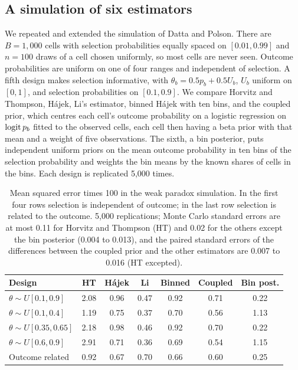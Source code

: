 \subsection{A simulation of six estimators}

We repeated and extended the simulation of Datta and Polson. There are $B = 1{,}000$ cells with selection probabilities equally spaced on $[0.01, 0.99]$ and $n = 100$ draws of a cell chosen uniformly, so most cells are never seen. Outcome probabilities are uniform on one of four ranges and independent of selection. A fifth design makes selection informative, with $\theta_b = 0.5p_b + 0.5U_b$, $U_b$ uniform on $[0,1]$, and selection probabilities on $[0.1, 0.9]$. We compare Horvitz and Thompson, H\'ajek, Li's estimator, binned H\'ajek with ten bins, and the coupled prior, which centres each cell's outcome probability on a logistic regression on $\operatorname{logit} p_b$ fitted to the observed cells, each cell then having a beta prior with that mean and a weight of five observations. The sixth, a bin posterior, puts independent uniform priors on the mean outcome probability in ten bins of the selection probability and weights the bin means by the known shares of cells in the bins. Each design is replicated 5,000 times.

\begin{table}[ht]
\centering
\caption{Mean squared error times 100 in the weak paradox simulation. In the first four rows selection is independent of outcome; in the last row selection is related to the outcome. 5,000 replications; Monte Carlo standard errors are at most 0.11 for Horvitz and Thompson (HT) and 0.02 for the others except the bin posterior (0.004 to 0.013), and the paired standard errors of the differences between the coupled prior and the other estimators are 0.007 to 0.016 (HT excepted).}
\label{tab:weak}
\small
\begin{tabular}{lcccccc}
\toprule
Design & HT & H\'ajek & Li & Binned & Coupled & Bin post. \\
\midrule
$\theta \sim U[0.1, 0.9]$ & 2.08 & 0.96 & 0.47 & 0.92 & 0.71 & 0.22 \\
$\theta \sim U[0.1, 0.4]$ & 1.19 & 0.75 & 0.37 & 0.70 & 0.56 & 1.13 \\
$\theta \sim U[0.35, 0.65]$ & 2.18 & 0.98 & 0.46 & 0.92 & 0.70 & 0.22 \\
$\theta \sim U[0.6, 0.9]$ & 2.91 & 0.71 & 0.36 & 0.69 & 0.54 & 1.15 \\
Outcome related & 0.92 & 0.67 & 0.70 & 0.66 & 0.60 & 0.25 \\
\bottomrule
\end{tabular}
\end{table}

